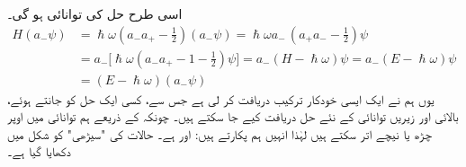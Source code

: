  اسی طرح حل   کی  توانائی  ہو گی۔
\begin{align*}
H(a_- \psi ) &= \hslash \omega ( a_- a_+   - \tfrac{1}{2}) (a_- \psi)    = \hslash \omega a_- \,( a_+ a_-  - \tfrac{1}{2} ) \psi\\
&= a_- \big[ \hslash \omega ( a_- a_+  - 1 - \tfrac{1}{2} ) \psi \big] = a_- ( H - \hslash \omega )\psi = a_- ( E - \hslash \omega) \psi \\	
&=( E - \hslash \omega ) ( a_- \psi )
\end{align*}
یوں ہم نے ایک ایسی خودکار ترکیب دریافت کر لی ہے  جس سے، کسی ایک حل کو جانتے ہوئے،  بالائی اور زیریں توانائی کے نئے حل دریافت کیے جا سکتے ہیں۔ چونکہ  کے ذریعے ہم توانائی میں اوپر چڑھ  یا نیچے اتر سکتے ہیں لہٰذا انہیں ہم  پکارتے ہیں:   اور    ہے۔ حالات کی "سیڑھی" کو شکل  میں دکھایا گیا ہے۔

